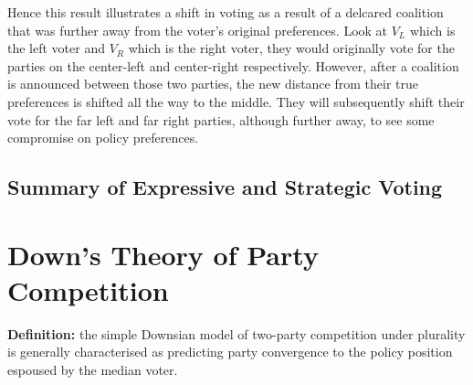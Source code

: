 \documentclass[12pt, letterpaper]{article}
\begin{document}
\begin{enumerate}
	Hence this result illustrates a shift in voting as a result of a delcared coalition that was further away from the voter's original preferences. Look at $V_L$ which is the left voter and $V_R$ which is the right voter, they would originally vote for the parties on the center-left and center-right respectively. However, after a coalition is announced between those two parties, the new distance from their true preferences is shifted all the way to the middle. They will subsequently shift their vote for the far left and far right parties, although further away, to see some compromise on policy preferences.
\end{enumerate}

\subsection{Summary of Expressive and Strategic Voting}


\newpage
\section{Down's Theory of Party Competition}
\textbf{Definition:} the simple Downsian model of two-party competition under plurality is generally characterised as predicting party convergence to the policy position espoused by the median voter.
\end{document}
